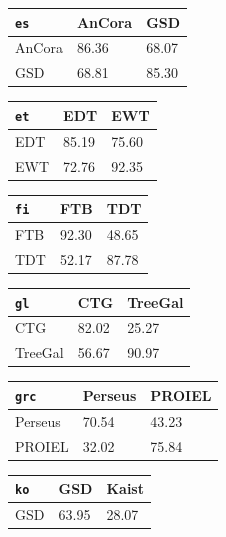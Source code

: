 \newpage

\begin{table}[H]
    \begin{minipage}{.45\linewidth}
    \begin{tabular}{|l|l|l|}
    \hline
    \verb|es| & AnCora & GSD \\
    \hline
    AnCora & 86.36 & 68.07 \\
    \hline
    GSD & 68.81 & 85.30 \\
    \hline
    \end{tabular}%
    \vspace{5mm}
    \begin{tabular}{|l|l|l|}
    \hline
    \verb|et| & EDT & EWT \\
    \hline
    EDT & 85.19 & 75.60 \\
    \hline
    EWT & 72.76 & 92.35 \\
    \hline
    \end{tabular}%
    \vspace{5mm}
    \begin{tabular}{|l|l|l|}
    \hline
    \verb|fi| & FTB & TDT \\
    \hline
    FTB & 92.30 & 48.65 \\
    \hline
    TDT & 52.17 & 87.78 \\
    \hline
    \end{tabular}%
    \vspace{5mm}
    \begin{tabular}{|l|l|l|}
    \hline
    \verb|gl| & CTG & TreeGal \\
    \hline
    CTG & 82.02 & 25.27 \\
    \hline
    TreeGal & 56.67 & 90.97 \\
    \hline
    \end{tabular}%
    \vspace{5mm}
    \begin{tabular}{|l|l|l|}
    \hline
    \verb|grc| & Perseus & PROIEL \\
    \hline
    Perseus & 70.54 & 43.23 \\
    \hline
    PROIEL & 32.02 & 75.84 \\
    \hline
    \end{tabular}%
    \vspace{5mm}
    \begin{tabular}{|l|l|l|}
    \hline
    \verb|ko| & GSD & Kaist \\
    \hline
    GSD & 63.95 & 28.07 \\

\end{tabular}
\end{minipage}
\end{table}
